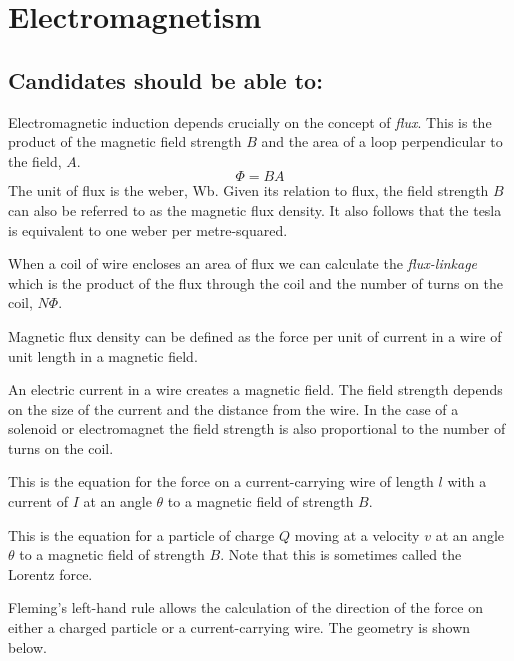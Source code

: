 \documentclass[main.tex]{subfiles}
\begin{document}
\chapter{Electromagnetism}

\section*{Candidates should be able to:}

Electromagnetic induction depends crucially on the concept of \emph{flux}. This is the product of the magnetic field strength $B$ and the area of a loop perpendicular to the field, $A$.
\[ \Phi = BA \]
The unit of flux is the weber, Wb. Given its relation to flux, the field strength $B$ can also be referred to as the magnetic flux density. It also follows that the tesla is equivalent to one weber per metre-squared.

When a coil of wire encloses an area of flux we can calculate the \emph{flux-linkage} which is the product of the flux through the coil and the number of turns on the coil, $N\Phi$.

Magnetic flux density can be defined as the force per unit of current in a wire of unit length in a magnetic field.


An electric current in a wire creates a magnetic field. The field strength depends on the size of the current and the distance from the wire. In the case of a solenoid or electromagnet the field strength is also proportional to the number of turns on the coil.


This is the equation for the force on a current-carrying wire of length $l$ with a current of $I$ at an angle $\theta$ to a magnetic field of strength $B$.


This is the equation for a particle of charge $Q$ moving at a velocity $v$ at an angle $\theta$ to a magnetic field of strength $B$. Note that this is sometimes called the Lorentz force.


Fleming's left-hand rule allows the calculation of the direction of the force on either a charged particle or a current-carrying wire. The geometry is shown below.
\end{document}
